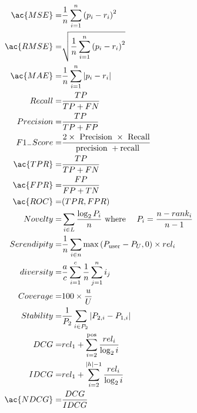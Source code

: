 \cite{fakhfakh_deep_2017}
\begin{align}
\ac{MSE}=         & \frac{1}{n} \sum_{i=1}^{n}\left(p_{i}-r_{i}\right)^{2} \\
\ac{RMSE}=        & \sqrt{\frac{1}{n} \sum_{i=1}^{n}\left(p_{i}-r_{i}\right)^{2}} \\
\ac{MAE}=         & \frac{1}{n} \sum_{i=1}^{n}\left|p_{i}-r_{i}\right| \\
Recall=      & \frac{T P}{T P+F N} \\
Precision=   & \frac{T P}{T P+F P} \\
F1_{-}Score= & \frac{2 \times \text { Precision } \times \text { Recall}}{\text { precision }+\text {recall}} \\
\ac{TPR} =        & \frac{T P}{T P+F N} \\
\ac{FPR} =        & \frac{F P}{F P+T N} \\
\ac{ROC}=& (TPR,FPR)\\
Novelty=     & \sum_{i \in L} \frac{\log _{2} P_{i}}{n} \text { where } \quad P_{i}=\frac{n-r a n k_{i}}{n-1} \\
Serendipity= & \frac{1}{n} \sum_{i \in n} \max \left(P_{\text {user}}-P_{U}, 0\right) \times r e l_{i} \\
diversity=   & \frac{a}{c} \sum_{i=1}^{c} \frac{1}{n} \sum_{j=1}^{n} i_{j} \\
Coverage=    & 100 \times \frac{u}{U} \\
Stability=   & \frac{1}{P_{2}} \sum_{i \in P_{2}}\left|P_{2, i}-P_{1, i}\right| \\
DCG=         & r e l_{1}+\sum_{i=2}^{\text {pos}} \frac{r e l_{i}}{\log _{2} i} \\
IDCG=        & r e l_{1}+\sum_{i=2}^{|h|-1} \frac{r e l_{i}}{\log _{2} i} \\
\ac{NDCG}=        & \frac{D C G}{I D C G} \\
\end{align}


\clearpage
\newpage